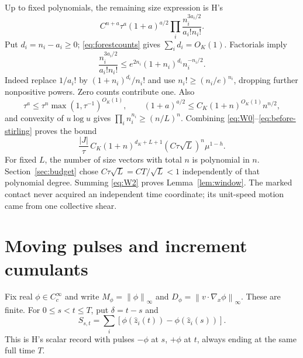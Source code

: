 \documentclass[11pt]{article}
\newcommand{\norm}[1]{\left\|#1\right\|}
\theoremstyle{definition}\newtheorem{definition}[theorem]{Definition}
\theoremstyle{remark}\newtheorem{remark}[theorem]{Remark}
\numberwithin{equation}{section}
\begin{document}
Up to fixed polynomials, the remaining size expression is H's
\begin{equation}\label{eq:before-stirling}
 C^{n+a}\tau^a(1+a)^{a/2}
                  \prod_i\frac{n_i^{3a_i/2}}{a_i!n_i!}.
\end{equation}
Put $d_i=n_i-a_i\ge0$; \eqref{eq:forestcounts} gives
$\sum_i d_i=O_K(1)$. Factorials imply
\[
 \frac{n_i^{3a_i/2}}{a_i!n_i!}
    \le e^{2n_i}(1+n_i)^{d_i}n_i^{-n_i/2}.
\]
Indeed replace $1/a_i!$ by $(1+n_i)^{d_i}/n_i!$ and use
$n_i!\ge(n_i/e)^{n_i}$, dropping further nonpositive powers.
Zero counts contribute one. Also
\[
 \tau^a\le\tau^n\max(1,\tau^{-1})^{O_K(1)},\qquad
 (1+a)^{a/2}\le C_K(1+n)^{O_K(1)}n^{n/2},
\]
and convexity of $u\log u$ gives $\prod_i n_i^{n_i}\ge(n/L)^n$.
Combining \eqref{eq:W0}--\eqref{eq:before-stirling} proves the bound
\begin{equation}\label{eq:W2}
 \frac{|J|}{\tau}\,C_K(1+n)^{d_K+L+1}
           (C\tau\sqrt L)^n\mu^{1-h}.
\end{equation}
For fixed $L$, the number of size vectors with total $n$ is polynomial in
$n$. Section~\ref{sec:budget} chose $C\tau\sqrt L=CT/\sqrt L<1$
independently of that polynomial degree. Summing \eqref{eq:W2} proves
Lemma~\ref{lem:window}. The marked contact never acquired an independent
time coordinate; its unit-speed motion came from one collective shear.

\section{Moving pulses and increment cumulants}\label{sec:increments}
Fix real $\phi\in C_c^\infty$ and write
$M_\phi=\norm\phi_\infty$ and
$D_\phi=\norm{v\cdot\nabla_x\phi}_\infty$. These are finite. For
$0\le s<t\le T$, put $\delta=t-s$ and
\[
 S_{s,t}=\sum_i[\phi(\hat z_i(t))-\phi(\hat z_i(s))].
\]
This is H's scalar record with pulses $-\phi$ at $s$, $+\phi$ at $t$,
always ending at the same full time $T$.
\end{document}
